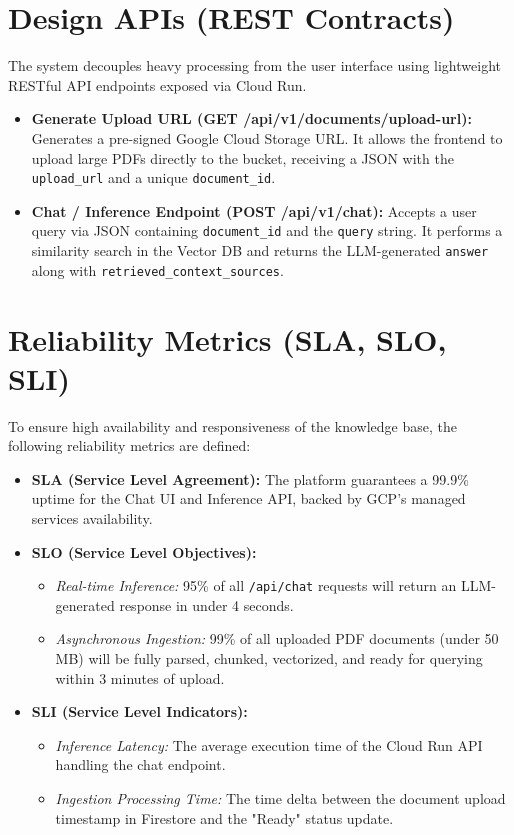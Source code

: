 \documentclass[12pt,a4paper]{article}
\begin{document}
\section{Design APIs (REST Contracts)}
The system decouples heavy processing from the user interface using lightweight RESTful API endpoints exposed via Cloud Run.
\begin{itemize}[label=\textbullet]
    \item \textbf{Generate Upload URL (GET /api/v1/documents/upload-url):} Generates a pre-signed Google Cloud Storage URL. It allows the frontend to upload large PDFs directly to the bucket, receiving a JSON with the \texttt{upload\_url} and a unique \texttt{document\_id}.
    \item \textbf{Chat / Inference Endpoint (POST /api/v1/chat):} Accepts a user query via JSON containing \texttt{document\_id} and the \texttt{query} string. It performs a similarity search in the Vector DB and returns the LLM-generated \texttt{answer} along with \texttt{retrieved\_context\_sources}.
\end{itemize}

\section{Reliability Metrics (SLA, SLO, SLI)}
To ensure high availability and responsiveness of the knowledge base, the following reliability metrics are defined:
\begin{itemize}[label=\textbullet]
    \item \textbf{SLA (Service Level Agreement):} The platform guarantees a 99.9\% uptime for the Chat UI and Inference API, backed by GCP's managed services availability.
    \item \textbf{SLO (Service Level Objectives):}
    \begin{itemize}
        \item \textit{Real-time Inference:} 95\% of all \texttt{/api/chat} requests will return an LLM-generated response in under 4 seconds.
        \item \textit{Asynchronous Ingestion:} 99\% of all uploaded PDF documents (under 50 MB) will be fully parsed, chunked, vectorized, and ready for querying within 3 minutes of upload.
    \end{itemize}
    \item \textbf{SLI (Service Level Indicators):}
    \begin{itemize}
        \item \textit{Inference Latency:} The average execution time of the Cloud Run API handling the chat endpoint.
        \item \textit{Ingestion Processing Time:} The time delta between the document upload timestamp in Firestore and the "Ready" status update.
    \end{itemize}
\end{itemize}
\end{document}

